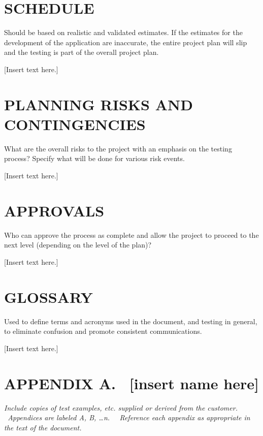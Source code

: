 \documentclass[twoside,letterpaper]{article}
\begin{document}
\section[SCHEDULE]{\bfseries\color{black} SCHEDULE}
{\itshape\color{black}

Should be based on realistic and validated estimates. If the estimates
for the development of the application are inaccurate, the entire
project plan will slip and the testing is part of the overall project plan.

}
{\color{black}
[Insert text here.]}

\section[PLANNING RISKS AND CONTINGENCIES]{\bfseries\color{black}
	 PLANNING RISKS AND CONTINGENCIES}
{\itshape\color{black}

What are the overall risks to the project with an emphasis on the
testing process? Specify what will be done for various risk events.

}
{\color{black}
[Insert text here.]}

\section[APPROVALS]{\bfseries\color{black} APPROVALS}
{\itshape\color{black}

Who can approve the process as complete and allow the project to
proceed to the next level (depending on the level of the plan)? 

}
{\color{black}
[Insert text here.]}

\section[GLOSSARY]{\bfseries\color{black} GLOSSARY}

{\itshape\color{black}

Used to define terms and acronyms used in the document, and testing in
general, to eliminate confusion and promote consistent communications.

}
{\color{black}
[Insert text here.]}



\clearpage\setcounter{page}{1}\pagestyle{Convertviii}
\section[APPENDIX A. \ [insert name
here{]}]{\bfseries\color{black} APPENDIX A.
\ [insert name here]}
{\itshape\color{black}
Include copies of test examples, etc. supplied or
derived from the customer. \ Appendices are labeled A, B, {\dots}n.
\ \ Reference each appendix as appropriate in the text of the document.
}
\end{document}
